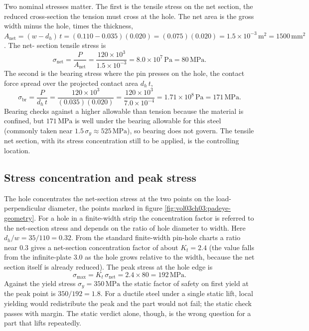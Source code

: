 Two nominal stresses matter. The first is the tensile stress on the net
section, the reduced cross-section the tension must cross at the hole.
The net area is the gross width minus the hole, times the thickness,
$A_{\text{net}} = (w - d_h)\,t = (0.110 - 0.035)(0.020) = (0.075)(0.020)
= 1.5\times 10^{-3}\,\si{\meter}^2 = 1500\,\si{\milli\meter}^2$. The net-
section tensile stress is
\[
\sigma_{\text{net}} = \frac{P}{A_{\text{net}}} = \frac{120\times 10^3}
{1.5\times 10^{-3}} = 8.0\times 10^7\,\text{Pa} = 80\,\text{MPa}.
\]
The second is the bearing stress where the pin presses on the hole, the
contact force spread over the projected contact area $d_h\,t$,
\[
\sigma_{\text{br}} = \frac{P}{d_h\,t} = \frac{120\times 10^3}{(0.035)
(0.020)} = \frac{120\times 10^3}{7.0\times 10^{-4}} = 1.71\times 10^8\,
\text{Pa} = 171\,\text{MPa}.
\]
Bearing checks against a higher allowable than tension because the
material is confined, but $171\,\text{MPa}$ is well under the bearing
allowable for this steel (commonly taken near $1.5\,\sigma_y \approx
525\,\text{MPa}$), so bearing does not govern. The tensile net section,
with its stress concentration still to be applied, is the controlling
location.

\subsection{Stress concentration and peak stress}

The hole concentrates the net-section stress at the two points on the
load-perpendicular diameter, the points marked in figure
\ref{fig:vol03ch03:padeye-geometry}. For a hole in a finite-width strip
the concentration factor is referred to the net-section stress and
depends on the ratio of hole diameter to width. Here $d_h/w = 35/110 =
0.32$. From the standard finite-width pin-hole charts
\cite[ch.~3]{text:shigley2020} a ratio near $0.3$ gives a
net-section concentration factor of about $K_t = 2.4$ (the value falls
from the infinite-plate $3.0$ as the hole grows relative to the width,
because the net section itself is already reduced). The peak stress at
the hole edge is
\[
\sigma_{\max} = K_t\,\sigma_{\text{net}} = 2.4 \times 80 = 192\,\text{
MPa}.
\]
Against the yield stress $\sigma_y = 350\,\text{MPa}$ the static factor
of safety on first yield at the peak point is $350/192 = 1.8$. For a
ductile steel under a single static lift, local yielding would
redistribute the peak and the part would not fail; the static check
passes with margin. The static verdict alone, though, is the wrong
question for a part that lifts repeatedly.

